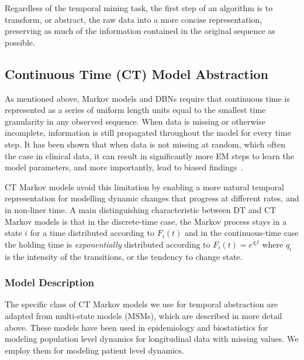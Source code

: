 Regardless of the temporal mining task, the first step of an algorithm is to transform,
or abstract, the raw data into a more concise representation, preserving as much of the
information contained in the original sequence as possible.

\subsection{Continuous Time (CT) Model Abstraction}
As mentioned above, Markov models and DBNs require that continuous time is represented as a series of uniform length units equal to the smallest time granularity in any observed sequence. When data is missing or otherwise incomplete, information is still propagated throughout the model for every time step. It has been shown that when data is not missing at random, which often the case in clinical data, it can result in significantly more EM steps to learn the model parameters, and more importantly, lead to biased findings~\cite{YehCS12}.

CT Markov models avoid this limitation by enabling a more natural temporal representation for modelling dynamic changes that progress at different rates, and in non-liner time. A main distinguishing characteristic between DT and CT Markov models is that in the discrete-time case, the Markov process stays in a state $i$ for a time distributed according to $F_{i}(t)$ and in the continuous-time case the holding time is \emph{exponentially} distributed according to $F_{i}(t) = e^{q_{i}t}$ where $q_{i}$ is the intensity of the transitions, or the tendency to change state.

\subsubsection{Model Description}

The specific class of CT Markov models we use for temporal abstraction are adapted from multi-state models (MSMs), which are described in more detail above.  These models have been used in epidemiology and biostatistics for modeling population level dynamics for longitudinal data with missing values.  We employ them for modeling patient level dynamics.

